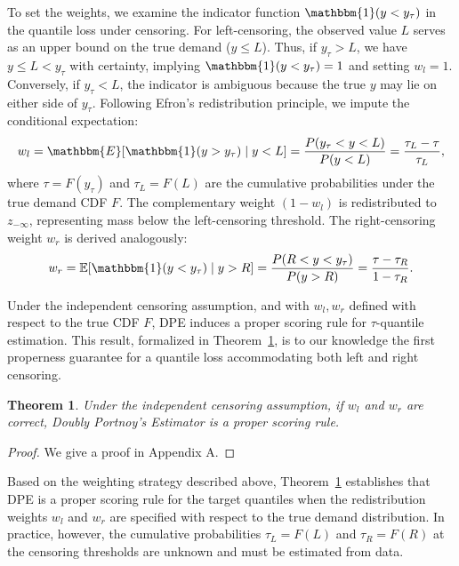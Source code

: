 \documentclass[sigconf]{acmart}
\newtheorem{theorem}{Theorem}
\begin{document}
To set the weights, we examine the indicator function $\mathbbm{1}(y < y_\tau)$ in the quantile loss under censoring. For left-censoring, the observed value $L$ serves as an upper bound on the true demand ($y \leq L$). Thus, if $y_\tau > L$, we have $y \leq L < y_\tau$ with certainty, implying $\mathbbm{1}(y < y_\tau) = 1$ and setting $w_l = 1$. Conversely, if $y_\tau < L$, the indicator is ambiguous because the true $y$ may lie on either side of $y_\tau$. Following Efron's \cite{wang2009locally} redistribution principle, we impute the conditional expectation:
\begin{align*}
w_l = \mathbbm{E}[\mathbbm{1}(y > y_\tau) \mid y < L] = \frac{P(y_\tau < y < L)}{P(y < L)} = \frac{\tau_L - \tau}{\tau_L},
\end{align*}
where $\tau = F(y_\tau)$ and $\tau_L = F(L)$ are the cumulative probabilities under the true demand CDF $F$. The complementary weight $(1-w_l)$ is redistributed to $z_{-\infty}$, representing mass below the left-censoring threshold. The right-censoring weight $w_r$ is derived analogously:
\begin{align*}
w_r = \mathbb{E}[\mathbbm{1}(y < y_\tau) \mid y > R] = \frac{P(R < y < y_\tau)}{P(y > R)} = \frac{\tau - \tau_R}{1 - \tau_R}.
\end{align*}

Under the independent censoring assumption, and with $w_l, w_r$ defined with respect to the true CDF $F$, DPE induces a proper scoring rule for $\tau$-quantile estimation. This result, formalized in Theorem~\ref{thm:dpe-proper}, is to our knowledge the first properness guarantee for a quantile loss accommodating both left and right censoring.

\begin{theorem}
\label{thm:dpe-proper}
Under the independent censoring assumption, if $w_l$ and $w_r$ are correct, Doubly Portnoy's Estimator is a proper scoring rule.
\end{theorem}
\begin{proof}
We give a proof in Appendix A.
\end{proof}

Based on the weighting strategy described above, Theorem~\ref{thm:dpe-proper} establishes that DPE is a proper scoring rule for the target quantiles when the redistribution weights $w_l$ and $w_r$ are specified with respect to the true demand distribution. In practice, however, the cumulative probabilities $\tau_L = F(L)$ and $\tau_R = F(R)$ at the censoring thresholds are unknown and must be estimated from data.
\end{document}
